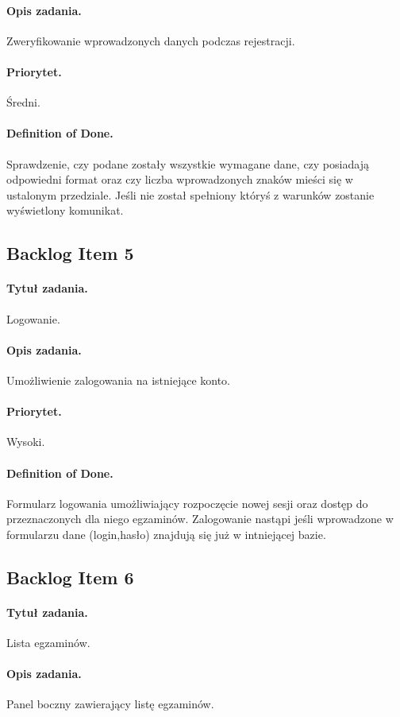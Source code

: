 \documentclass[a4paper]{article}
\begin{document}
\paragraph{Opis zadania.} Zweryfikowanie wprowadzonych danych podczas rejestracji.
\paragraph{Priorytet.} Średni.
\paragraph{Definition of Done.} Sprawdzenie, czy podane zostały wszystkie wymagane dane, czy posiadają odpowiedni format oraz czy liczba wprowadzonych znaków mieści się w ustalonym przedziale. Jeśli nie został spełniony któryś z warunków zostanie wyświetlony komunikat.

\subsection{Backlog Item 5}
\paragraph{Tytuł zadania.} Logowanie.
\paragraph{Opis zadania.} Umożliwienie zalogowania na istniejące konto.
\paragraph{Priorytet.} Wysoki.
\paragraph{Definition of Done.} Formularz logowania umożliwiający rozpoczęcie nowej sesji oraz dostęp do przeznaczonych dla niego egzaminów. Zalogowanie nastąpi jeśli wprowadzone w formularzu dane (login,hasło) znajdują się już w intniejącej bazie.

\subsection{Backlog Item 6}
\paragraph{Tytuł zadania.} Lista egzaminów.
\paragraph{Opis zadania.} Panel boczny zawierający listę egzaminów.
\end{document}
